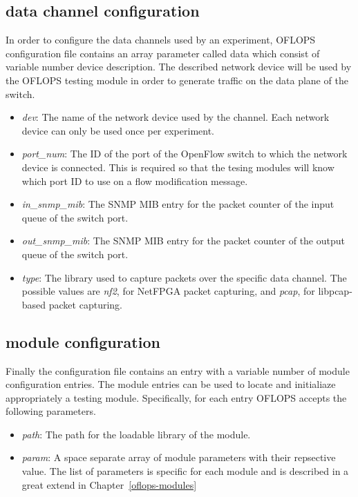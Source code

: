 \documentclass{book}
\begin{document}
\subsection{data channel configuration}

In order to configure the data channels used by an experiment, OFLOPS 
configuration file contains an array parameter called data which consist 
of variable number device description. The described network device will
be used by the OFLOPS testing module in order to generate traffic on the data
plane of the switch. 

\begin{itemize}
\item \emph{dev}: The name of the network device used by the channel. Each 
network device can only be used once per experiment. 
\item \emph{port\_num}: The ID of the port of the OpenFlow switch to which 
the network device is connected. This is required so that the tesing modules
will know which port ID to use on a flow modification message. 
\item \emph{in\_snmp\_mib}: The SNMP MIB entry for the packet counter of the 
input queue of the switch port. 
\item \emph{out\_snmp\_mib}: The SNMP MIB entry for the packet counter of the
output queue of the switch port. 
\item \emph{type}: The library used to capture packets over the specific data
channel. The possible values are \emph{nf2}, for NetFPGA packet capturing, and 
\emph{pcap}, for libpcap-based packet capturing. 
\end{itemize}

\subsection{module configuration}

Finally the configuration file contains an entry with a variable number
of module configuration entries. The module entries can be used to locate 
and initialiaze appropriately a testing module. Specifically, for each entry
OFLOPS accepts the following parameters. 

\begin{itemize}
\item \emph{path}: The path for the loadable library of the module. 
\item \emph{param}: A space separate array of module parameters with their 
repsective value. The list of parameters is specific for each module and is 
described in a great extend in Chapter~\ref{oflops-modules}
\end{itemize}
\end{document}
